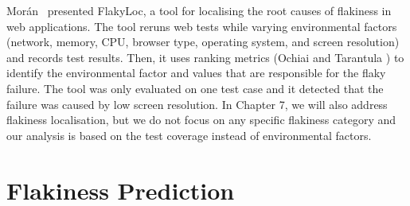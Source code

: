 Morán~\cite{flakyloc} presented FlakyLoc, a tool for localising the root causes of flakiness in web applications. The tool reruns web tests while varying environmental factors (network, memory, CPU, browser type, operating system, and screen resolution) and records test results. Then, it uses ranking metrics (Ochiai and Tarantula \cite{sbfl-evaluation,tarantula}) to identify the environmental factor and values that are responsible for the flaky failure. The tool was only evaluated on one test case and it detected that the failure was caused by low screen resolution. 
In Chapter 7, we will also address flakiness localisation, but we do not focus on any specific flakiness category and our analysis is based on the test coverage instead of environmental factors.



\section{Flakiness Prediction}

